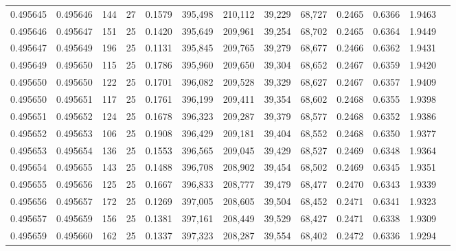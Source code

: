 \begin{tabular}{rrrrrrrrrrrrr}
0.495645 & 0.495646 &   144 &  27 &                                     0.1579 & 395,498 & 210,112 &  39,229 &  68,727 & 0.2465 & 0.6366 & 1.9463 \\
0.495646 & 0.495647 &   151 &  25 &                                     0.1420 & 395,649 & 209,961 &  39,254 &  68,702 & 0.2465 & 0.6364 & 1.9449 \\
0.495647 & 0.495649 &   196 &  25 &                                     0.1131 & 395,845 & 209,765 &  39,279 &  68,677 & 0.2466 & 0.6362 & 1.9431 \\
0.495649 & 0.495650 &   115 &  25 &                                     0.1786 & 395,960 & 209,650 &  39,304 &  68,652 & 0.2467 & 0.6359 & 1.9420 \\
0.495650 & 0.495650 &   122 &  25 &                                     0.1701 & 396,082 & 209,528 &  39,329 &  68,627 & 0.2467 & 0.6357 & 1.9409 \\
0.495650 & 0.495651 &   117 &  25 &                                     0.1761 & 396,199 & 209,411 &  39,354 &  68,602 & 0.2468 & 0.6355 & 1.9398 \\
0.495651 & 0.495652 &   124 &  25 &                                     0.1678 & 396,323 & 209,287 &  39,379 &  68,577 & 0.2468 & 0.6352 & 1.9386 \\
0.495652 & 0.495653 &   106 &  25 &                                     0.1908 & 396,429 & 209,181 &  39,404 &  68,552 & 0.2468 & 0.6350 & 1.9377 \\
0.495653 & 0.495654 &   136 &  25 &                                     0.1553 & 396,565 & 209,045 &  39,429 &  68,527 & 0.2469 & 0.6348 & 1.9364 \\
0.495654 & 0.495655 &   143 &  25 &                                     0.1488 & 396,708 & 208,902 &  39,454 &  68,502 & 0.2469 & 0.6345 & 1.9351 \\
0.495655 & 0.495656 &   125 &  25 &                                     0.1667 & 396,833 & 208,777 &  39,479 &  68,477 & 0.2470 & 0.6343 & 1.9339 \\
0.495656 & 0.495657 &   172 &  25 &                                     0.1269 & 397,005 & 208,605 &  39,504 &  68,452 & 0.2471 & 0.6341 & 1.9323 \\
0.495657 & 0.495659 &   156 &  25 &                                     0.1381 & 397,161 & 208,449 &  39,529 &  68,427 & 0.2471 & 0.6338 & 1.9309 \\
0.495659 & 0.495660 &   162 &  25 &                                     0.1337 & 397,323 & 208,287 &  39,554 &  68,402 & 0.2472 & 0.6336 & 1.9294 \\

\end{tabular}
